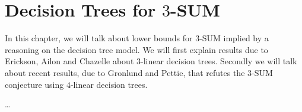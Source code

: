 \chapter{Decision Trees for $3$-SUM}

In this chapter, we will talk about lower bounds for $3$-SUM implied by
a reasoning on the decision tree model. We will first explain results due to
Erickson, Ailon and Chazelle about $3$-linear decision trees. Secondly we will
talk about recent results, due to Gronlund and Pettie, that refutes the $3$-SUM
conjecture using $4$-linear decision trees.

\dots
